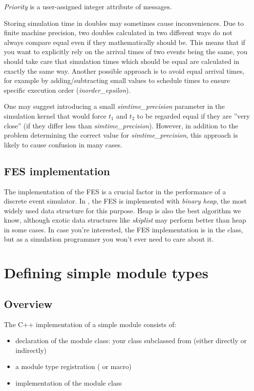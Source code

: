 \textit{Priority} is a user-assigned integer
attribute of messages.

Storing simulation time in doubles may sometimes cause inconveniences.
Due to finite machine precision, two doubles calculated in two
different ways do not always compare equal even if they mathematically
should be. This means that if you want to explicitly rely on the
arrival times of two events being the same, you should take care that
simulation times which should be equal are calculated in exactly the
same way. Another possible approach is to avoid equal arrival times,
for example by adding/subtracting small values to schedule times to
ensure specific execution order
(\textit{inorder\_epsilon}).


One may suggest introducing a small \textit{simtime\_precision} parameter in
the simulation kernel that would force $t_{1}$ and $t_{2}$ to be regarded
equal if they are ''very close'' (if they differ
less than \textit{simtime\_precision}). However, in addition to the problem
determining the correct value for \textit{simtime\_precision},
this approach is likely to cause confusion in many cases.



\subsection{FES implementation}

The implementation of the FES is a crucial factor in the
performance of a discrete event simulator. In {\opp}, the FES is
implemented with \textit{binary heap}, the most
widely used data structure for this purpose. Heap is also the best
algorithm we know, although exotic data structures like
\textit{skiplist} may perform better than heap in some
cases. In case you're interested, the FES implementation is in the
 class, but as a simulation programmer you won't
ever need to care about it.


\section{Defining simple module types}

\subsection{Overview}

The C++ implementation of a simple module consists of:
\begin{itemize}
\item{declaration of the module class: your class subclassed from 
(either directly or indirectly)}
\item{a module type registration ( or
     macro)}
\item{implementation of the module class}
\end{itemize}


